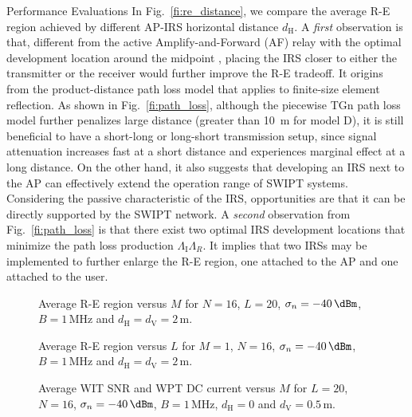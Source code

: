 \documentclass[journal]{IEEEtran}
\begin{document}
\begin{section}{Performance Evaluations}
		In Fig.~\ref{fi:re_distance}, we compare the average R-E region achieved by different AP-IRS horizontal distance $d_{\mathrm{H}}$. A \textit{first} observation is that, different from the active Amplify-and-Forward (AF) relay with the optimal development location around the midpoint \cite{Li2017}, placing the IRS closer to either the transmitter or the receiver would further improve the R-E tradeoff. It origins from the product-distance path loss model that applies to finite-size element reflection. As shown in Fig.~\ref{fi:path_loss}, although the piecewise TGn path loss model further penalizes large distance (greater than \SI{10}{\meter} for model D), it is still beneficial to have a short-long or long-short transmission setup, since signal attenuation increases fast at a short distance and experiences marginal effect at a long distance. On the other hand, it also suggests that developing an IRS next to the AP can effectively extend the operation range of SWIPT systems. Considering the passive characteristic of the IRS, opportunities are that it can be directly supported by the SWIPT network. A \textit{second} observation from Fig.~\ref{fi:path_loss} is that there exist two optimal IRS development locations that minimize the path loss production $\Lambda_{\mathrm{I}}\Lambda_R$. It implies that two IRSs may be implemented to further enlarge the R-E region, one attached to the AP and one attached to the user.

		\begin{figure}[!t]
			\centering
			\begin{adjustbox}{width=0.9\columnwidth}
				
			\end{adjustbox}
			\caption{Average R-E region versus $M$ for $N=16$, $L=20$, $\sigma_n=-40\,\si{\dBm}$, $B=1\,\si{\MHz}$ and $d_{\mathrm{H}}=d_{\mathrm{V}}=2\,\si{\meter}$.}
			\label{fi:re_tx}
		\end{figure}

		\begin{figure}[!t]
			\centering
			\begin{adjustbox}{width=0.9\columnwidth}
				
			\end{adjustbox}
			\caption{Average R-E region versus $L$ for $M=1$, $N=16$, $\sigma_n=-40\,\si{\dBm}$, $B=1\,\si{\MHz}$ and $d_{\mathrm{H}}=d_{\mathrm{V}}=2\,\si{\meter}$.}
			\label{fi:re_reflector}
		\end{figure}

		\begin{figure}[!t]
			\centering
			\begin{adjustbox}{width=0.9\columnwidth}
				
			\end{adjustbox}
			\caption{Average WIT SNR and WPT DC current versus $M$ for $L=20$, $N=16$, $\sigma_n=-40\,\si{\dBm}$, $B=1\,\si{\MHz}$, $d_{\mathrm{H}}=0$ and $d_{\mathrm{V}}=0.5\,\si{\meter}$.}
			\label{fi:scaling_tx}
		\end{figure}


\end{section}
\end{document}
